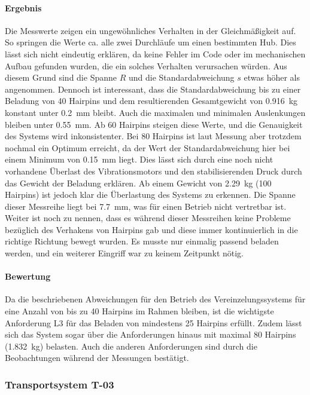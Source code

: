 \paragraph{Ergebnis}
Die Messwerte zeigen ein ungewöhnliches Verhalten in der Gleichmäßigkeit auf. So springen die Werte ca. alle zwei Durchläufe um
einen bestimmten Hub. Dies lässt sich nicht eindeutig erklären, da keine Fehler im Code oder im mechanischen Aufbau gefunden wurden,
die ein solches Verhalten verursachen würden. Aus diesem Grund sind die Spanne $R$ und die Standardabweichung $s$ etwas höher als angenommen.
Dennoch ist interessant, dass die Standardabweichung bis zu einer Beladung von 40 Hairpins und dem resultierenden Gesamtgewicht von
\qty{0.916}{\kilo\gram} konstant unter \qty{0.2}{\milli\meter} bleibt. Auch die maximalen und minimalen Auslenkungen bleiben unter
\qty{0.55}{\milli\meter}. Ab 60 Hairpins steigen diese Werte, und die Genauigkeit des Systems wird inkonsistenter. Bei 80 Hairpins ist
laut Messung aber trotzdem nochmal ein Optimum erreicht, da der Wert der Standardabweichung hier bei einem Minimum von
\qty{0.15}{\milli\meter} liegt. Dies lässt sich durch eine noch nicht vorhandene Überlast des Vibrationsmotors und den stabilisierenden
Druck durch das Gewicht der Beladung erklären. Ab einem Gewicht von \qty{2.29}{\kilo\gram} (100 Hairpins) ist jedoch klar die Überlastung
des Systems zu erkennen. Die Spanne dieser Messreihe liegt bei \qty{7.7}{\milli\meter}, was für einen Betrieb nicht vertretbar
ist. Weiter ist noch zu nennen, dass es während dieser Messreihen keine Probleme bezüglich des Verhakens von Hairpins gab und
diese immer kontinuierlich in die richtige Richtung bewegt wurden. Es musste nur einmalig passend beladen werden, und ein weiterer Eingriff
war zu keinem Zeitpunkt nötig.

\paragraph{Bewertung}
Da die beschriebenen Abweichungen für den Betrieb des Vereinzelungssystems für eine Anzahl von bis zu 40 Hairpins im Rahmen bleiben,
ist die wichtigste Anforderung L3 für das Beladen von mindestens 25 Hairpins erfüllt. Zudem lässt sich das System sogar über die Anforderungen hinaus mit maximal 80 Hairpins
(\qty{1.832}{\kilo\gram}) belasten. Auch die anderen Anforderungen sind durch die Beobachtungen während der Messungen bestätigt.

\subsubsection{Transportsystem T-03}

